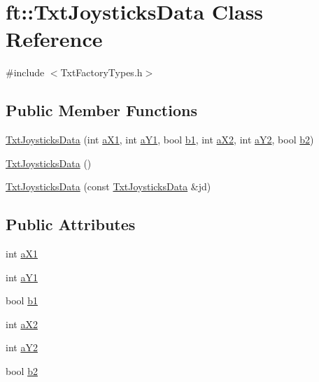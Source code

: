 \hypertarget{classft_1_1_txt_joysticks_data}{}\section{ft\+:\+:Txt\+Joysticks\+Data Class Reference}
\label{classft_1_1_txt_joysticks_data}


{\ttfamily \#include $<$Txt\+Factory\+Types.\+h$>$}

\subsection*{Public Member Functions}
\begin{DoxyCompactItemize}
\item 
\hyperlink{classft_1_1_txt_joysticks_data_a13ddd352952775ada8806046722f89f8}{Txt\+Joysticks\+Data} (int \hyperlink{classft_1_1_txt_joysticks_data_afdd2de6ff6b777ec9f90bea9c3fd8b21}{a\+X1}, int \hyperlink{classft_1_1_txt_joysticks_data_a1ac5f6311efce3b5709fe1473e8ea644}{a\+Y1}, bool \hyperlink{classft_1_1_txt_joysticks_data_aeff9b78b9b8164ab6f3c2250afa3c171}{b1}, int \hyperlink{classft_1_1_txt_joysticks_data_af0719a7144158d38346658e950b3885c}{a\+X2}, int \hyperlink{classft_1_1_txt_joysticks_data_a1f0f0ab1c9ce007a12b57663343d9e9a}{a\+Y2}, bool \hyperlink{classft_1_1_txt_joysticks_data_a69e694fa165365b2498e592d7cdb17e2}{b2})
\item 
\hyperlink{classft_1_1_txt_joysticks_data_a7cae8310400b3eb35f55c450d808edf0}{Txt\+Joysticks\+Data} ()
\item 
\hyperlink{classft_1_1_txt_joysticks_data_af28ad2342115de5a200b92b7401c989c}{Txt\+Joysticks\+Data} (const \hyperlink{classft_1_1_txt_joysticks_data}{Txt\+Joysticks\+Data} \&jd)
\end{DoxyCompactItemize}
\subsection*{Public Attributes}
\begin{DoxyCompactItemize}
\item 
int \hyperlink{classft_1_1_txt_joysticks_data_afdd2de6ff6b777ec9f90bea9c3fd8b21}{a\+X1}
\item 
int \hyperlink{classft_1_1_txt_joysticks_data_a1ac5f6311efce3b5709fe1473e8ea644}{a\+Y1}
\item 
bool \hyperlink{classft_1_1_txt_joysticks_data_aeff9b78b9b8164ab6f3c2250afa3c171}{b1}
\item 
int \hyperlink{classft_1_1_txt_joysticks_data_af0719a7144158d38346658e950b3885c}{a\+X2}
\item 
int \hyperlink{classft_1_1_txt_joysticks_data_a1f0f0ab1c9ce007a12b57663343d9e9a}{a\+Y2}
\item 
bool \hyperlink{classft_1_1_txt_joysticks_data_a69e694fa165365b2498e592d7cdb17e2}{b2}
\end{DoxyCompactItemize}


